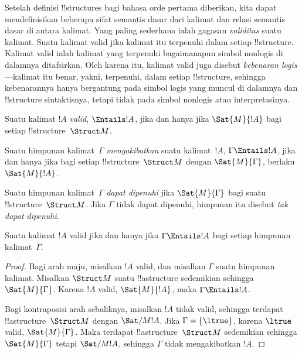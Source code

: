 \documentclass[../../../include/open-logic-section]{subfiles}
\begin{document}

\begin{explain}
Setelah definisi !!{structure}s bagi bahasa orde pertama diberikan, kita
dapat mendefinisikan beberapa sifat semantis dasar dari kalimat dan relasi
semantis dasar di antara kalimat. Yang paling sederhana ialah gagasan
\emph{validitas} suatu kalimat. Suatu kalimat valid jika kalimat itu
terpenuhi dalam setiap !!{structure}. Kalimat valid ialah kalimat yang
terpenuhi bagaimanapun simbol nonlogis di dalamnya ditafsirkan. Oleh karena
itu, kalimat valid juga disebut \emph{kebenaran logis}---kalimat itu benar,
yakni, terpenuhi, dalam setiap !!{structure}, sehingga kebenarannya hanya
bergantung pada simbol logis yang muncul di dalamnya dan !!{structure}
sintaktisnya, tetapi tidak pada simbol nonlogis atau interpretasinya.
\end{explain}

\begin{defn}[Validitas]
Suatu kalimat $!A$ \emph{valid}, $\Entails !A$, jika dan hanya jika
$\Sat{M}{!A}$ bagi setiap !!{structure}~$\Struct M$.
\end{defn}

\begin{defn}[Perikutan]
Suatu himpunan kalimat~$\Gamma$ \emph{mengakibatkan} suatu kalimat~$!A$,
$\Gamma \Entails !A$, jika dan hanya jika bagi setiap
!!{structure}~$\Struct M$ dengan $\Sat{M}{\Gamma}$, berlaku
$\Sat{M}{!A}$.
\end{defn}


\begin{defn}[Keterpenuhan]
Suatu himpunan kalimat~$\Gamma$ \emph{dapat dipenuhi} jika
$\Sat{M}{\Gamma}$ bagi suatu !!{structure}~$\Struct M$. Jika $\Gamma$ tidak
dapat dipenuhi, himpunan itu disebut \emph{tak dapat dipenuhi}.
\end{defn}

\begin{prop}
Suatu kalimat $!A$ valid jika dan hanya jika $\Gamma \Entails !A$ bagi setiap
himpunan kalimat~$\Gamma$.
\end{prop}

\begin{proof}
Bagi arah maju, misalkan $!A$ valid, dan misalkan $\Gamma$ suatu himpunan
kalimat. Misalkan $\Struct M$ suatu !!a{structure} sedemikian sehingga
$\Sat{M}{\Gamma}$. Karena $!A$ valid, $\Sat{M}{!A}$, maka
$\Gamma \Entails !A$.

Bagi kontraposisi arah sebaliknya, misalkan $!A$ tidak valid, sehingga
terdapat !!a{structure}~$\Struct M$ dengan $\Sat/{M}{!A}$. Jika
$\Gamma = \{ \ltrue \}$, karena $\ltrue$ valid, $\Sat{M}{\Gamma}$. Maka
terdapat !!a{structure}~$\Struct M$ sedemikian sehingga
$\Sat{M}{\Gamma}$ tetapi $\Sat/{M}{!A}$, sehingga $\Gamma$ tidak
mengakibatkan $!A$.
\end{proof}
\end{document}
